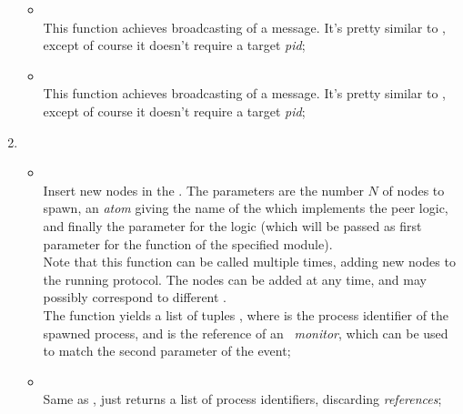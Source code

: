 \begin{enumerate}
\begin{itemize}
            \item {} \\
                This function achieves broadcasting of a message. It's
                pretty similar to , except of course it
                doesn't require a target \emph{pid};

            \item {} \\
                This function achieves broadcasting of a message. It's
                pretty similar to , except of course it
                doesn't require a target \emph{pid};

            \end{itemize}

        \item   {}

            \begin{itemize}
            \item {} \\
                Insert new nodes in the 
                . The parameters are the number $N$ of
                nodes to spawn, an \emph{atom} giving the name of the
                 which implements the peer
                logic, and finally the parameter for the logic (which will
                be passed as first parameter for the 
                function of the specified module). \\
                Note that this function can be called multiple times,
                adding new nodes to the running protocol. The nodes can be
                added at any time, and may possibly correspond to
                different . \\
                The function yields a list of tuples ,
                where  is the process identifier of the spawned
                process, and  is the reference of an
                \emph{\Erlang\ monitor}, which can be used to match the
                second parameter of the 
                event;

            \item {} \\
                Same as , just returns a list of
                process identifiers, discarding \emph{references};


\end{itemize}
\end{enumerate}
